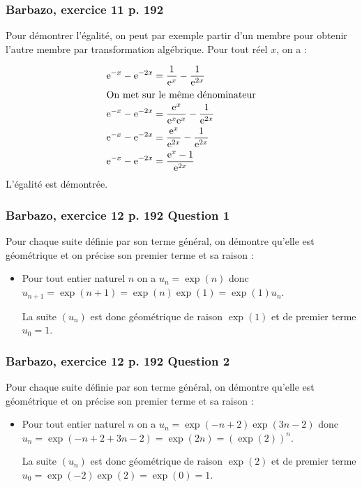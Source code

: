 \documentclass[11pt, hyperref={urlcolor=red,%
            linkcolor=blue, %
            colorlinks=true}]{beamer}
\begin{document}
\begin{frame}
\frametitle{Barbazo, exercice 11 p. 192}
\label{exo11}
Pour démontrer l'égalité, on peut par exemple partir d'un membre pour obtenir l'autre membre par transformation algébrique. Pour tout réel $x$, on a :

\begin{align*}
	\text{e}^{-x}-\text{e}^{-2x} &=\frac{1}{\text{e}^{x}} - \frac{1}{\text{e}^{2x}} \\
	\intertext{On met sur le même dénominateur}
\text{e}^{-x}-\text{e}^{-2x} &=\frac{\text{e}^{x}}{\text{e}^{x}\text{e}^{x}} - \frac{1}{\text{e}^{2x}}\\
		\text{e}^{-x}-\text{e}^{-2x} &=\frac{\text{e}^{x}}{\text{e}^{2x}} - \frac{1}{\text{e}^{2x}}\\
			\text{e}^{-x}-\text{e}^{-2x}&=\frac{\text{e}^{x}-1}{\text{e}^{2x}}
\end{align*}
L'égalité est démontrée.

\end{frame}


\begin{frame}
\frametitle{Barbazo, exercice 12 p. 192 Question 1}
\label{exo12}
Pour chaque suite définie par son terme général, on démontre qu'elle est géométrique et on précise son premier terme et sa raison :

\begin{itemize}
	\item Pour tout entier naturel $n$ on a $u_{n}=\exp(n)$ donc $u_{n+1}=\exp(n+1)=\exp(n)\exp(1)=\exp(1)u_{n}$.
	
	La suite $\left(u_{n}\right)$ est donc géométrique de raison $\exp(1)$ et de premier terme $u_{0}=1$.
	
	
	
\end{itemize}


\end{frame}



\begin{frame}
\frametitle{Barbazo, exercice 12 p. 192 Question 2}

Pour chaque suite définie par son terme général, on démontre qu'elle est géométrique et on précise son premier terme et sa raison :

\begin{itemize}

	
	\item Pour tout entier naturel $n$ on a $u_{n}=\exp(-n+2)\exp(3n-2)$ donc $u_{n}=\exp(-n+2+3n-2)=\exp(2n)=\left(\exp(2)\right)^{n}$.
	
	La suite $\left(u_{n}\right)$ est donc géométrique de raison $\exp(2)$ et de premier terme $u_{0}=\exp(-2)\exp(2)=\exp(0)=1$.
	
		
	
	
\end{itemize}


\end{frame}
\end{document}
